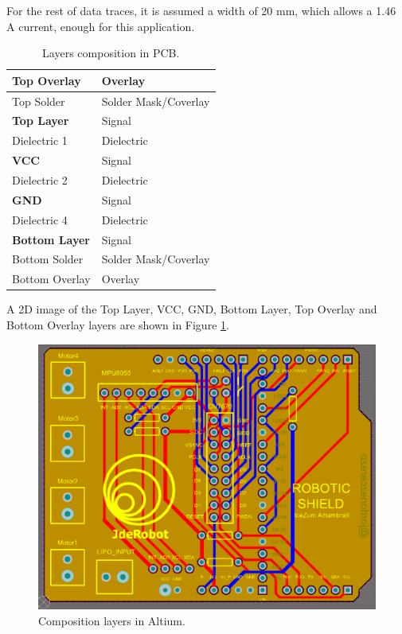 For the rest of data traces, it is assumed a width of 20 mm, which allows a 1.46 A current, enough for this application.


\renewcommand\tablename{Table}
\begin{table}[H]
	\centering
	
	\begin{tabular}{|l|l|}
		\hline
		Top Overlay           & Overlay              \\ \hline
		Top Solder            & Solder Mask/Coverlay \\ \hline
		\textbf{Top Layer}    & Signal               \\ \hline
		Dielectric 1          & Dielectric           \\ \hline
		\textbf{VCC}          & Signal               \\ \hline
		Dielectric 2          & Dielectric           \\ \hline
		\textbf{GND}          & Signal               \\ \hline
		Dielectric 4          & Dielectric           \\ \hline
		\textbf{Bottom Layer} & Signal               \\ \hline
		Bottom Solder         & Solder Mask/Coverlay \\ \hline
		Bottom Overlay        & Overlay              \\ \hline
	\end{tabular}
	\caption{Layers composition in PCB.}
	\label{tabla:layers_altium}
\end{table}



A 2D image of the Top Layer, VCC, GND, Bottom Layer, Top Overlay and Bottom Overlay layers are shown in Figure \ref{fig:layers_altium}.


\begin{center}
	\begin{figure}[H]
		\center
		\includegraphics[scale=0.4, angle=90]{imagenes/Balancing_Robot/layers_altium.PNG}
		\caption{Composition layers in Altium.}
		\label{fig:layers_altium}
	\end{figure}
\end{center}


